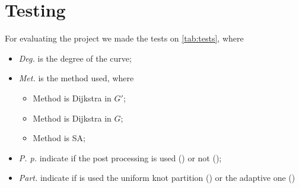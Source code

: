 \documentclass[dissertation.tex]{subfiles}
\begin{document}
\chapter{Testing}\label{cha:testing}
For evaluating the project we made the tests on \cref{tab:tests},
where
\begin{itemize}
\item \emph{Deg.} is the degree of the \bs curve;
\item \emph{Met.} is the method used, where
  \begin{itemize}
  \item Method \metA is Dijkstra in $G'$;
  \item Method \metB is Dijkstra in $G$;
  \item Method \metC is \acl{SA};
  \end{itemize}
\item \emph{P. p.} indicate if the post processing is used (\ypp) or
  not (\npp);
\item \emph{Part.} indicate if is used the uniform knot partition
  (\nad) or the adaptive one (\yad)
\end{itemize}
\end{document}

